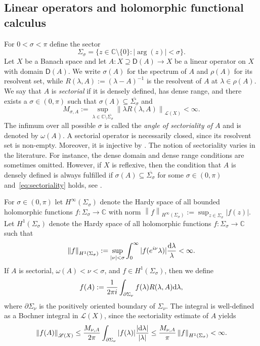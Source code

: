 \documentclass[12pt,a4paper, reqno]{amsart}
\theoremstyle{plain}
\theoremstyle{definition}
\theoremstyle{remark}
\numberwithin{equation}{section}
\newcommand{\1}{\mathbbm{1}}
\newcommand{\dd}{\textup{d}}
\newcommand{\C}{\ensuremath{\mathbb{C}}}
\newcommand{\sL}{\ensuremath{\mathscr{L}}}
\newcommand{\sfD}{\ensuremath{\mathsf{D}}}
\newcommand{\scrL}{\ensuremath{\mathscr{L}}}
\newcommand{\nrm}[1]{\left\lVert #1 \right\rVert}
\begin{document}
\subsection{Linear operators and holomorphic functional calculus}
\label{sec:prelim:Calculus}
For $0<\sigma<\pi$ define the sector 
\[
\Sigma_\sigma=\{z\in \C\setminus\{0\}\colon |\arg(z)|<\sigma\}. 
\]
Let $X$ be a Banach space and let $ A\colon X\supseteq\sfD(A)\rightarrow X $ be a linear operator on $X$ with domain $\sfD(A)$. 
We write $\sigma(A)$ for the spectrum of $A$ and $\rho(A)$ for its resolvent set, while $R(\lambda,A):=(\lambda-A)^{-1}$ is the resolvent of $A$ at $\lambda\in\rho(A)$.
We say that $ A $ is \emph{sectorial} if 
it is densely defined, has dense range, and 
there exists a $ \sigma\in (0,\pi) $ such that $ \sigma(A)\subseteq \overline{\Sigma_\sigma} $ and 
\begin{equation}\label{eq:sectoriality}
M_{\sigma,A}:=\sup_{\lambda\in\C\setminus \overline{\Sigma_\sigma}}\nrm{\lambda R(\lambda,A)}_{\scrL(X)}<\infty.
\end{equation}
The infimum over all possible $ \sigma $ is called the \emph{angle of sectoriality of $A$} and is denoted by $ \omega(A)$. 
A sectorial operator is necessarily closed, since its resolvent set is non-empty. Moreover, it is injective by \cite[Proposition 10.1.8]{aibs2}.
The notion of sectoriality varies in the literature. For instance, the dense domain and dense range conditions are sometimes omitted. 
However, if $X$ is reflexive, then the condition that $A$ is densely defined is always fulfilled if $\sigma(A)\subseteq \overline{\Sigma_\sigma}$ for some $\sigma\in (0,\pi)$ and~\eqref{eq:sectoriality} holds, see \cite[Proposition 10.1.9]{aibs2}.

For $ \sigma\in (0,\pi ) $ let $ H^\infty(\Sigma_\sigma) $ denote the Hardy space of all bounded holomorphic functions $ f\colon \Sigma_\sigma \rightarrow \C $ with norm 
$ \nrm{f}_{H^\infty(\Sigma_\sigma)}:= \sup_{z\in\Sigma_\sigma}|f(z)| $.  Let $ H^1(\Sigma_\sigma) $ denote the Hardy space of all holomorphic functions $ f\colon \Sigma_\sigma \rightarrow \C $ such that
$$
\nrm{f}_{H^1(\Sigma_\sigma)} := \sup_{|\nu| <\sigma } \int_{0}^\infty|f(e^{i\nu} \lambda)|\frac{\dd \lambda }{\lambda}<\infty.
$$
If $ A $ is sectorial, $ \omega(A) <\nu<\sigma $, and $f\in H^1(\Sigma_\sigma)$, then we define 
\[ f(A):=\frac{1}{2\pi i}\int_{\partial\Sigma_\nu}f(\lambda)R(\lambda,A)\dd\lambda,\] 
where $ \partial\Sigma_\nu $ is the positively oriented boundary of $\Sigma_\nu$.
The integral is well-defined as a Bochner integral in $\sL(X)$, since the sectoriality estimate of $A$ yields 
\[ \nrm{f(A)}_{\sL(X)}\le \frac{M_{\nu,A}}{2\pi}\int_{\partial \Sigma_\nu} |f(\lambda)|\frac{|\dd \lambda |}{|\lambda|} \leq \frac{M_{\nu,A}}{\pi}\nrm{f}_{H^1(\Sigma_\sigma)} <\infty.  \]
\end{document}
